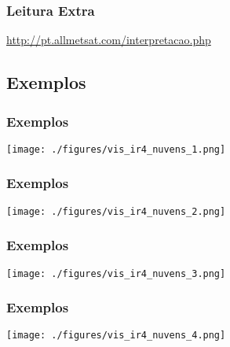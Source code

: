\begin{frame}
  \frametitle{Leitura Extra}
  \begin{block}{}
    \url{http://pt.allmetsat.com/interpretacao.php}
  \end{block}
\end{frame}



\subsection{Exemplos}
\begin{frame}
\frametitle{Exemplos}
  \begin{center}
    \texttt{[image: ./figures/vis\_ir4\_nuvens\_1.png]}
  \end{center}
\end{frame}

\begin{frame}
\frametitle{Exemplos}
  \begin{center}
    \texttt{[image: ./figures/vis\_ir4\_nuvens\_2.png]}
  \end{center}
\end{frame}

\begin{frame}
\frametitle{Exemplos}
  \begin{center}
    \texttt{[image: ./figures/vis\_ir4\_nuvens\_3.png]}
  \end{center}
\end{frame}

\begin{frame}
\frametitle{Exemplos}
  \begin{center}
    \texttt{[image: ./figures/vis\_ir4\_nuvens\_4.png]}
  \end{center}
\end{frame}



